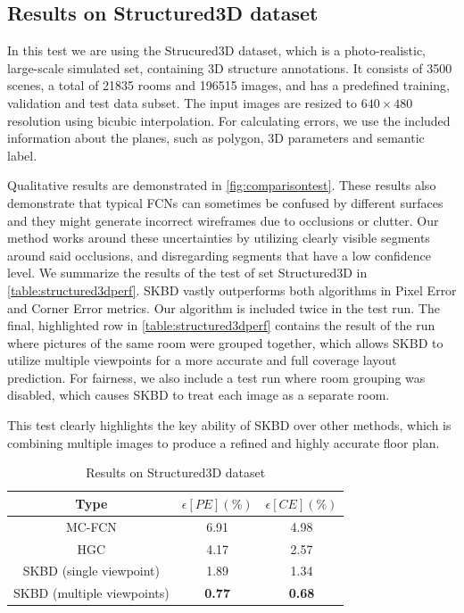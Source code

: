 \subsection{Results on Structured3D dataset}
In this test we are using the Strucured3D dataset\cite{zheng2020structured3d}, which is a photo-realistic, large-scale simulated set, containing 3D structure annotations. It consists of 3500 scenes, a total of 21835 rooms and 196515 images, and has a predefined training, validation and test data subset. The input images are resized to \(640 \times 480 \) resolution using bicubic interpolation. For calculating errors, we use the included information about the planes, such as polygon, 3D parameters and semantic label.

Qualitative results are demonstrated in \autoref{fig:comparisontest}. These results also demonstrate that typical FCNs can sometimes be confused by different surfaces and they might generate incorrect wireframes due to occlusions or clutter. Our method works around these uncertainties by utilizing clearly visible segments around said occlusions, and disregarding segments that have a low confidence level. We summarize the results of the test of set Structured3D in \autoref{table:structured3dperf}. SKBD vastly outperforms both algorithms in Pixel Error and Corner Error metrics. Our algorithm is included twice in the test run. The final, highlighted row in \autoref{table:structured3dperf} contains the result of the run where pictures of the same room were grouped together, which allows SKBD to utilize multiple viewpoints for a more accurate and full coverage layout prediction. For fairness, we also include a test run where room grouping was disabled, which causes SKBD to treat each image as a separate room.

This test clearly highlights the key ability of SKBD over other methods, which is combining multiple images to produce a refined and highly accurate floor plan.

\begin{table}[H]
\centering
\begin{tabular}{|c | c c |}
    \hline
    Type & $\epsilon[PE](\%)$ & $\epsilon[CE](\%)$ \\ [0.5 ex]
    \hline\hline
    MC-FCN & 6.91 & 4.98 \\
    HGC & 4.17 & 2.57 \\
    SKBD (single viewpoint) & 1.89 & 1.34 \\
    \hline
    SKBD (multiple viewpoints) & \textbf{0.77} & \textbf{0.68} \\
    \hline
\end{tabular}
\caption{Results on Structured3D dataset}
\label{table:structured3dperf}
\end{table}


